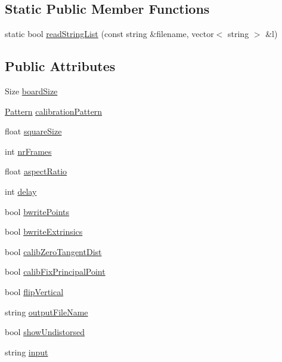 \subsection*{Static Public Member Functions}
\begin{DoxyCompactItemize}
\item 
static bool \hyperlink{classSettings_ae57696cead99c4f0c528e33793866457}{read\-String\-List} (const string \&filename, vector$<$ string $>$ \&l)
\end{DoxyCompactItemize}
\subsection*{Public Attributes}
\begin{DoxyCompactItemize}
\item 
Size \hyperlink{classSettings_a5030a7164df923bb3b86dd7a0fc9af30}{board\-Size}
\item 
\hyperlink{classSettings_a0e7117abd9427a6f8bc1d1d8d456b5c8}{Pattern} \hyperlink{classSettings_a94551b7ffe8ac60311b035b2905e9498}{calibration\-Pattern}
\item 
float \hyperlink{classSettings_a6c94708776ad1ce258fc44f2101f5941}{square\-Size}
\item 
int \hyperlink{classSettings_a7e6654cd0e51791ed687eaa85f8fc143}{nr\-Frames}
\item 
float \hyperlink{classSettings_af55c910308a0d773055d0b19261bb3b8}{aspect\-Ratio}
\item 
int \hyperlink{classSettings_a5fe947366441009187d633f9e4663256}{delay}
\item 
bool \hyperlink{classSettings_ab4aac97bdb5696d60b35a29c26497064}{bwrite\-Points}
\item 
bool \hyperlink{classSettings_af1ac412d660e25aea698c76fa88de57c}{bwrite\-Extrinsics}
\item 
bool \hyperlink{classSettings_a4bc7ff147d74721a3587ce6fcb64ef32}{calib\-Zero\-Tangent\-Dist}
\item 
bool \hyperlink{classSettings_a44397eea3f08a0c78808c38bdd716594}{calib\-Fix\-Principal\-Point}
\item 
bool \hyperlink{classSettings_ab6304f260b315d2820f755e1c3a052b5}{flip\-Vertical}
\item 
string \hyperlink{classSettings_a9468f1ad53e982f9541d76c8d3228900}{output\-File\-Name}
\item 
bool \hyperlink{classSettings_a935d6f27ee454e9fee63f8b662f48a06}{show\-Undistorsed}
\item 
string \hyperlink{classSettings_a9970d51ab47b6560ab11b267637b6219}{input}

\end{DoxyCompactItemize}
